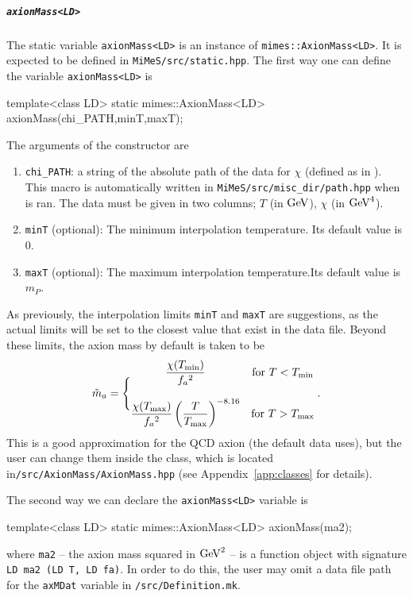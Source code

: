 \documentclass[11pt,a4paper]{article}
\begin{document}
\subparagraph{{\tt axionMass<LD>}} The static  variable {\tt axionMass<LD>} is an instance of {\tt mimes::AxionMass<LD>}. It is expected to be defined in  {\tt MiMeS/src/static.hpp}. The first way one can define the variable {\tt axionMass<LD>} is
%
\begin{cpp}
	template<class LD> static mimes::AxionMass<LD> axionMass(chi_PATH,minT,maxT);
\end{cpp}
%
The arguments of the constructor are
%
\begin{enumerate}
	\item {\tt chi\_PATH}: a string of the absolute path of the data for $\chi$ (defined as in ). This macro is automatically
	written in {\tt MiMeS/src/misc\_dir/path.hpp} when  is ran. The data must be given in two columns; $T$ (in ${\rm GeV}$), $\chi$ (in ${\rm GeV}^4$).
	\item {\tt minT} (optional): The minimum interpolation temperature. Its default value is $0$.
	\item {\tt maxT} (optional): The maximum interpolation temperature.Its default value is $m_P$.
\end{enumerate} 
%
As previously, the interpolation limits {\tt minT} and {\tt maxT} are suggestions, as the actual limits will be set to the closest value that exist in the data file. Beyond these limits, the axion mass by default is taken to be 
%
\begin{equation}
	\tilde m_{a}{} = \Bigg\{
	\begin{matrix}
		\dfrac{\chi(T_{\rm min})}{f_{a}{}^2} & \text{for } T<T_{\rm min} 
		\\ \\
		\dfrac{\chi(T_{\rm max})}{f_{a}{}^2}   \left( \dfrac{T}{T_{\rm max}} \right)^{-8.16} & \text{for } T>T_{\rm max} 
	\end{matrix} \;.
\end{equation}
%
This is a good approximation for the QCD axion (the default data \mimes uses), but the user can change them inside the class, which is located in{\tt \mimes/src/AxionMass/AxionMass.hpp} (see Appendix~\ref{app:classes} for details). 


The second way we can declare the {\tt axionMass<LD>} variable is
%
\begin{cpp}
	template<class LD> static mimes::AxionMass<LD> axionMass(ma2);
\end{cpp}
%
where {\tt ma2} -- the axion mass squared in ${\rm GeV}^2$ -- is a function object with signature {\tt LD ma2 (LD T, LD fa)}. In order to do this, 
the user may omit a data file path for the {\tt axMDat} variable in {\tt \mimes/src/Definition.mk}.
\end{document}
